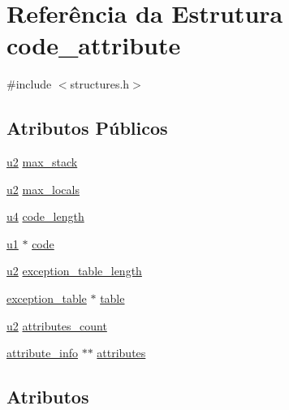 \hypertarget{structcode__attribute}{}\section{Referência da Estrutura code\+\_\+attribute}
\label{structcode__attribute}


{\ttfamily \#include $<$structures.\+h$>$}

\subsection*{Atributos Públicos}
\begin{DoxyCompactItemize}
\item 
\hyperlink{lista__operandos_8h_a732cde1300aafb73b0ea6c2558a7a54f}{u2} \hyperlink{structcode__attribute_abd4d398c165a4e91f3ea559808931473}{max\+\_\+stack}
\item 
\hyperlink{lista__operandos_8h_a732cde1300aafb73b0ea6c2558a7a54f}{u2} \hyperlink{structcode__attribute_ab75487f3c1d38f9fb6ad5e71ab99dea2}{max\+\_\+locals}
\item 
\hyperlink{lista__operandos_8h_ae5be1f726785414dd1b77d60df074c9d}{u4} \hyperlink{structcode__attribute_a8c2176f2e2a92747fd2920fde5992b43}{code\+\_\+length}
\item 
\hyperlink{lista__operandos_8h_ad9f4cdb6757615aae2fad89dab3c5470}{u1} $\ast$ \hyperlink{structcode__attribute_a72ecf2f84184325965481ecbc8d997cd}{code}
\item 
\hyperlink{lista__operandos_8h_a732cde1300aafb73b0ea6c2558a7a54f}{u2} \hyperlink{structcode__attribute_ab84a776a1bdeb79fde3b47279d8e12e4}{exception\+\_\+table\+\_\+length}
\item 
\hyperlink{structexception__table}{exception\+\_\+table} $\ast$ \hyperlink{structcode__attribute_a8bdff0149755249696a5d6aa288d7a98}{table}
\item 
\hyperlink{lista__operandos_8h_a732cde1300aafb73b0ea6c2558a7a54f}{u2} \hyperlink{structcode__attribute_a7c0a342c05fa196324b0806f6704916b}{attributes\+\_\+count}
\item 
\hyperlink{structattribute__info}{attribute\+\_\+info} $\ast$$\ast$ \hyperlink{structcode__attribute_a6e986c701d34b14f33959e35606b46ed}{attributes}
\end{DoxyCompactItemize}


\subsection{Atributos}
\mbox{\label{structcode__attribute_a6e986c701d34b14f33959e35606b46ed}} 
